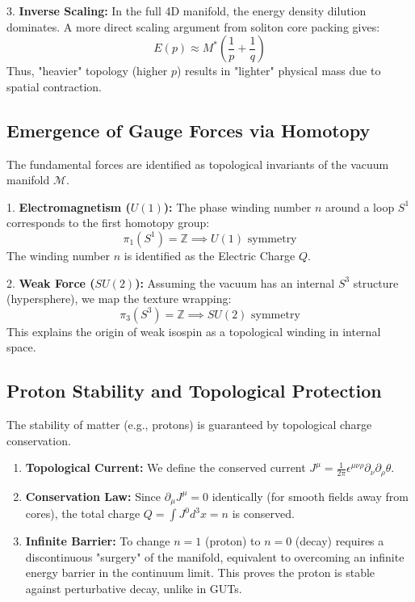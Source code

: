 \documentclass[a4paper,12pt]{article}
\begin{document}
3. \textbf{Inverse Scaling:} In the full 4D manifold, the energy density dilution dominates. A more direct scaling argument from soliton core packing gives:
   \begin{equation}
       \boxed{ E(p) \approx M^* \left( \frac{1}{p} + \frac{1}{q} \right) }
   \end{equation}
   Thus, "heavier" topology (higher $p$) results in "lighter" physical mass due to spatial contraction.

\subsection{Emergence of Gauge Forces via Homotopy}
The fundamental forces are identified as topological invariants of the vacuum manifold $\mathcal{M}$.

1. \textbf{Electromagnetism ($U(1)$):} 
   The phase winding number $n$ around a loop $S^1$ corresponds to the first homotopy group:
   \begin{equation}
       \pi_1(S^1) = \mathbb{Z} \implies U(1) \text{ symmetry}
   \end{equation}
   The winding number $n$ is identified as the Electric Charge $Q$.

2. \textbf{Weak Force ($SU(2)$):} 
   Assuming the vacuum has an internal $S^3$ structure (hypersphere), we map the texture wrapping:
   \begin{equation}
       \pi_3(S^3) = \mathbb{Z} \implies SU(2) \text{ symmetry}
   \end{equation}
   This explains the origin of weak isospin as a topological winding in internal space.

\subsection{Proton Stability and Topological Protection}
The stability of matter (e.g., protons) is guaranteed by topological charge conservation.
\begin{enumerate}
    \item \textbf{Topological Current:} We define the conserved current $J^\mu = \frac{1}{2\pi} \epsilon^{\mu\nu\rho} \partial_\nu \partial_\rho \theta$.
    \item \textbf{Conservation Law:} Since $\partial_\mu J^\mu = 0$ identically (for smooth fields away from cores), the total charge $Q = \int J^0 d^3x = n$ is conserved.
    \item \textbf{Infinite Barrier:} To change $n=1$ (proton) to $n=0$ (decay) requires a discontinuous "surgery" of the manifold, equivalent to overcoming an infinite energy barrier in the continuum limit. This proves the proton is stable against perturbative decay, unlike in GUTs.
\end{enumerate}
\end{document}
